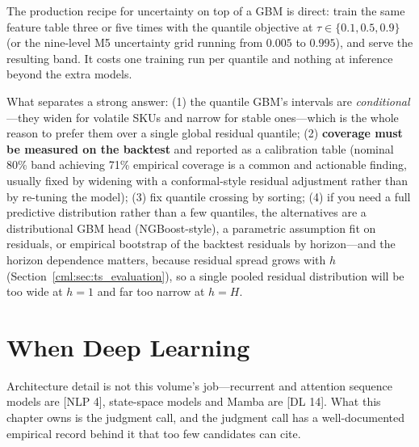 The production recipe for uncertainty on top of a GBM is direct: train the same feature table three or five times with the quantile objective at $\tau \in \{0.1, 0.5, 0.9\}$ (or the nine-level M5 uncertainty grid running from $0.005$ to $0.995$), and serve the resulting band. It costs one training run per quantile and nothing at inference beyond the extra models.

What separates a strong answer: (1) the quantile GBM's intervals are \emph{conditional}---they widen for volatile SKUs and narrow for stable ones---which is the whole reason to prefer them over a single global residual quantile; (2) \textbf{coverage must be measured on the backtest} and reported as a calibration table (nominal 80\% band achieving 71\% empirical coverage is a common and actionable finding, usually fixed by widening with a conformal-style residual adjustment rather than by re-tuning the model); (3) fix quantile crossing by sorting; (4) if you need a full predictive distribution rather than a few quantiles, the alternatives are a distributional GBM head (NGBoost-style), a parametric assumption fit on residuals, or empirical bootstrap of the backtest residuals by horizon---and the horizon dependence matters, because residual spread grows with $h$ (Section~\ref{cml:sec:ts_evaluation}), so a single pooled residual distribution will be too wide at $h=1$ and far too narrow at $h=H$.

\section{When Deep Learning}
\label{cml:sec:ts_deep_learning}

Architecture detail is not this volume's job---recurrent and attention sequence models are [NLP 4], state-space models and Mamba are [DL 14]. What this chapter owns is the judgment call, and the judgment call has a well-documented empirical record behind it that too few candidates can cite.

